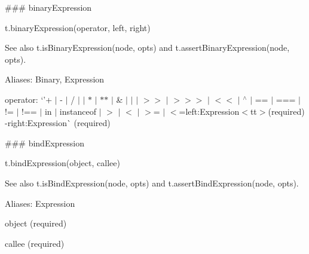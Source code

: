 \#\#\# binary\+Expression 
\begin{DoxyCode}
t.binaryExpression(operator, left, right)
\end{DoxyCode}


See also {\ttfamily t.\+is\+Binary\+Expression(node, opts)} and {\ttfamily t.\+assert\+Binary\+Expression(node, opts)}.

Aliases\+: {\ttfamily Binary}, {\ttfamily Expression}


\begin{DoxyItemize}
\item {\ttfamily operator}\+: `'+\textquotesingle{} $\vert$ \textquotesingle{}-\/\textquotesingle{} $\vert$ \textquotesingle{}/\textquotesingle{} $\vert$ \textquotesingle{}\textquotesingle{} $\vert$ \textquotesingle{}$\ast$\textquotesingle{} $\vert$ \textquotesingle{}$\ast$$\ast$\textquotesingle{} $\vert$ \textquotesingle{}\&\textquotesingle{} $\vert$ \textquotesingle{}$\vert$\textquotesingle{} $\vert$ \textquotesingle{}$>$$>$\textquotesingle{} $\vert$ \textquotesingle{}$>$$>$$>$\textquotesingle{} $\vert$ \textquotesingle{}$<$$<$\textquotesingle{} $\vert$ \textquotesingle{}$^\wedge$\textquotesingle{} $\vert$ \textquotesingle{}==\textquotesingle{} $\vert$ \textquotesingle{}===\textquotesingle{} $\vert$ \textquotesingle{}!=\textquotesingle{} $\vert$ \textquotesingle{}!==\textquotesingle{} $\vert$ \textquotesingle{}in\textquotesingle{} $\vert$ \textquotesingle{}instanceof\textquotesingle{} $\vert$ \textquotesingle{}$>$\textquotesingle{} $\vert$ \textquotesingle{}$<$\textquotesingle{} $\vert$ \textquotesingle{}$>$=\textquotesingle{} $\vert$ \textquotesingle{}$<$=left{\ttfamily \+:}Expression$<$tt$>$(required) -\/right{\ttfamily \+:}Expression\`{} (required) 


\end{DoxyItemize}

\#\#\# bind\+Expression 
\begin{DoxyCode}
t.bindExpression(object, callee)
\end{DoxyCode}


See also {\ttfamily t.\+is\+Bind\+Expression(node, opts)} and {\ttfamily t.\+assert\+Bind\+Expression(node, opts)}.

Aliases\+: {\ttfamily Expression}


\begin{DoxyItemize}
\item {\ttfamily object} (required)
\item {\ttfamily callee} (required) 


\end{DoxyItemize}

